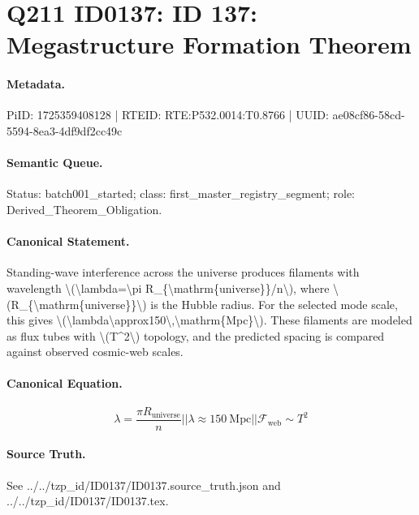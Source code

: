 \section*{Q211 ID0137: ID 137: Megastructure Formation Theorem}
\paragraph{Metadata.}
PiID: 1725359408128 | RTEID: RTE:P532.0014:T0.8766 | UUID: ae08cf86-58cd-5594-8ea3-4df9df2cc49c

\paragraph{Semantic Queue.}
Status: batch001\_started; class: first\_master\_registry\_segment; role: Derived\_Theorem\_Obligation.

\paragraph{Canonical Statement.}
Standing-wave interference across the universe produces filaments with wavelength \textbackslash{}(\textbackslash{}lambda=\textbackslash{}pi R\_\{\textbackslash{}mathrm\{universe\}\}/n\textbackslash{}), where \textbackslash{}(R\_\{\textbackslash{}mathrm\{universe\}\}\textbackslash{}) is the Hubble radius. For the selected mode scale, this gives \textbackslash{}(\textbackslash{}lambda\textbackslash{}approx150\textbackslash{},\textbackslash{}mathrm\{Mpc\}\textbackslash{}). These filaments are modeled as flux tubes with \textbackslash{}(T\textasciicircum{}2\textbackslash{}) topology, and the predicted spacing is compared against observed cosmic-web scales.

\paragraph{Canonical Equation.}
\[
\lambda=\frac{\pi R_{\mathrm{universe}}}{n} || \lambda \approx 150\ \mathrm{Mpc} || \mathcal{F}_{\mathrm{web}}\sim T^2
\]

\paragraph{Source Truth.}
See ../../tzp\_id/ID0137/ID0137.source\_truth.json and ../../tzp\_id/ID0137/ID0137.tex.

